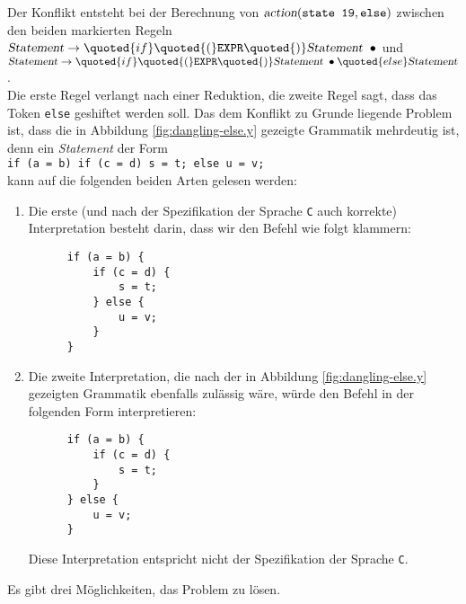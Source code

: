 Der Konflikt entsteht bei der Berechnung von $\textsl{action}(\texttt{state 19}, \texttt{else})$ zwischen den
beiden markierten Regeln
\\[0.2cm]
\hspace*{1.3cm}
$\textsl{Statement} \rightarrow \quoted{if} \quoted{(} \texttt{EXPR} \quoted{)} \textsl{Statement}\;\; \bullet$ 
\quad und
\\[0.2cm]
\hspace*{1.3cm}
$\textsl{Statement} \rightarrow 
\quoted{if} \quoted{(} \texttt{EXPR} \quoted{)} \textsl{Statement} \;\bullet \quoted{else} \textsl{Statement}$.
\\[0.2cm]
Die erste Regel verlangt nach einer Reduktion, die zweite Regel sagt, dass das Token 
\texttt{else} geshiftet werden soll.  Das dem Konflikt zu Grunde liegende Problem ist, dass die in Abbildung
\ref{fig:dangling-else.y} gezeigte Grammatik mehrdeutig ist, denn ein \textsl{Statement} der Form
\\[0.2cm]
\hspace*{1.3cm}
\texttt{if (a = b) if (c = d) s = t; else u = v;}
\\[0.2cm]
kann auf die folgenden beiden Arten gelesen werden:
\begin{enumerate}
\item Die erste (und nach der Spezifikation der Sprache \texttt{C} auch korrekte) Interpretation 
      besteht darin, dass wir den Befehl wie folgt klammern:
      \begin{verbatim}
      if (a = b) {
          if (c = d) {
              s = t; 
          } else {
              u = v;
          }
      }
      \end{verbatim}
      \vspace*{-0.7cm}
\item Die zweite Interpretation, die nach der in Abbildung
      \ref{fig:dangling-else.y} gezeigten Grammatik ebenfalls zul\"assig w\"are,
      w\"urde den Befehl in der folgenden Form interpretieren:
      \begin{verbatim}
      if (a = b) {
          if (c = d) {
              s = t; 
          }
      } else {
          u = v;
      }
      \end{verbatim}
      \vspace*{-0.5cm}

      Diese Interpretation entspricht nicht der Spezifikation der Sprache \texttt{C}.
\end{enumerate}
Es gibt drei M\"oglichkeiten, das Problem zu l\"osen.
